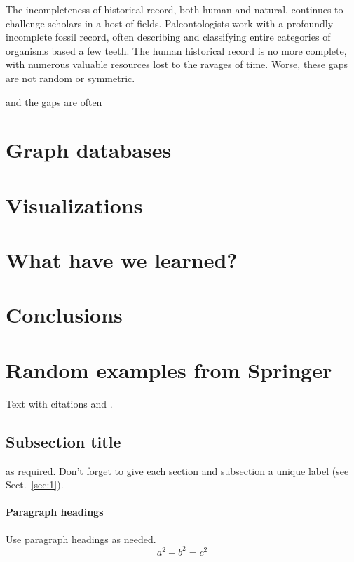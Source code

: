 The incompleteness of historical record, both human and natural, continues
to challenge scholars in a host of fields. Paleontologists work with a profoundly
incomplete fossil record, often describing and classifying entire categories of
organisms based a few teeth. The human historical record is no more complete,
with numerous valuable resources lost to the ravages of time. Worse, these gaps
are not random or symmetric. 

 and the gaps are often

\section{Graph databases}
\label{sec:graph_DBs}

\section{Visualizations}
\label{sec:visualizations}

\section{What have we learned?}
\label{sec:learned}

\section{Conclusions}
\label{sec:conclusions}


\section{Random examples from Springer}


Text with citations \cite{RefB} and \cite{RefJ}.

\subsection{Subsection title}
\label{sec:2}
as required. Don't forget to give each section
and subsection a unique label (see Sect.~\ref{sec:1}).
\paragraph{Paragraph headings} Use paragraph headings as needed.
\begin{equation}
a^2+b^2=c^2
\end{equation}

